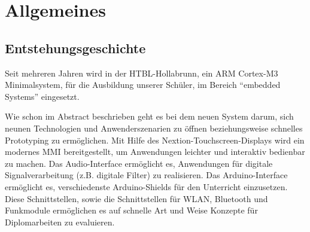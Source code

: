\section{Allgemeines}
\label{sec:allgemeines}

\subsection{Entstehungsgeschichte}
\label{sec:entstehungsgeschichte}

Seit mehreren Jahren wird in der HTBL-Hollabrunn, ein ARM Cortex-M3 \gls{Minimalsystem}, für die Ausbildung unserer Schüler, im Bereich \enquote{embedded Systems} eingesetzt.

Wie schon im Abstract beschrieben geht es bei dem neuen System darum, sich neunen Technologien und Anwenderszenarien zu öffnen beziehungsweise schnelles Prototyping zu ermöglichen. Mit Hilfe des Nextion-Touchscreen-Displays wird ein modernes \gls{MMI} bereitgestellt, um Anwendungen leichter und interaktiv bedienbar zu machen. Das Audio-Interface ermöglicht es, Anwendungen für digitale Signalverarbeitung (z.B. digitale Filter) zu realisieren. Das Arduino-Interface ermöglicht es, verschiedenste Arduino-Shields für den Unterricht einzusetzen. Diese Schnittstellen, sowie die Schnittstellen für WLAN, Bluetooth und Funkmodule ermöglichen es auf schnelle Art und Weise Konzepte für Diplomarbeiten zu evaluieren.
